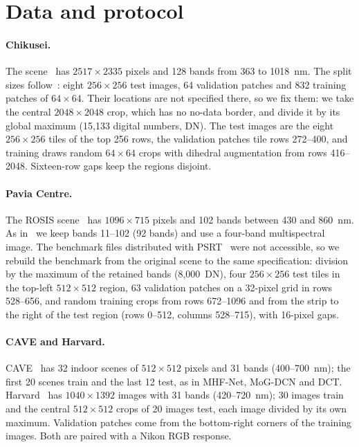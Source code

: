\documentclass[10pt,twocolumn,letterpaper]{article}
\begin{document}
\section{Data and protocol}
\label{sec:data}
\label{sec:setup}
\paragraph{Chikusei.} The scene~\cite{yokoya2016chikusei} has $2517\times2335$ pixels and 128 bands from 363 to 1018~nm. The split sizes follow~\cite{chen2026twostage}: eight $256\times256$ test images, 64 validation patches and 832 training patches of $64\times64$. Their locations are not specified there, so we fix them: we take the central $2048\times2048$ crop, which has no no-data border, and divide it by its global maximum (15{,}133 digital numbers, DN). The test images are the eight $256\times256$ tiles of the top 256 rows, the validation patches tile rows 272--400, and training draws random $64\times64$ crops with dihedral augmentation from rows 416--2048. Sixteen-row gaps keep the regions disjoint.

\paragraph{Pavia Centre.} The ROSIS scene~\cite{gamba2004pavia} has $1096\times715$ pixels and 102 bands between 430 and 860~nm. As in~\cite{chen2026twostage} we keep bands 11--102 (92 bands) and use a four-band multispectral image. The benchmark files distributed with PSRT~\cite{deng2023psrt} were not accessible, so we rebuild the benchmark from the original scene to the same specification: division by the maximum of the retained bands (8{,}000~DN), four $256\times256$ test tiles in the top-left $512\times512$ region, 63 validation patches on a 32-pixel grid in rows 528--656, and random training crops from rows 672--1096 and from the strip to the right of the test region (rows 0--512, columns 528--715), with 16-pixel gaps.

\paragraph{CAVE and Harvard.} CAVE~\cite{yasuma2010cave} has 32 indoor scenes of $512\times512$ pixels and 31 bands (400--700~nm); the first 20 scenes train and the last 12 test, as in MHF-Net, MoG-DCN and DCT. Harvard~\cite{chakrabarti2011harvard} has $1040\times1392$ images with 31 bands (420--720~nm); 30 images train and the central $512\times512$ crops of 20 images test, each image divided by its own maximum. Validation patches come from the bottom-right corners of the training images. Both are paired with a Nikon RGB response.
\end{document}
